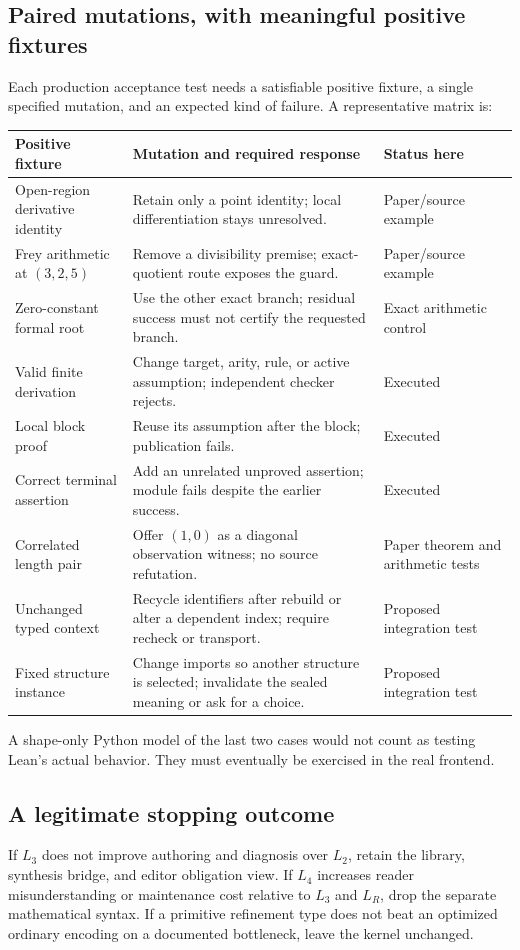 \documentclass[11pt,a4paper]{article}
\theoremstyle{plain}
\theoremstyle{definition}
\theoremstyle{remark}
\begin{document}
\subsection{Paired mutations, with meaningful positive fixtures}
Each production acceptance test needs a satisfiable positive fixture, a single specified mutation, and an expected kind of failure. A representative matrix is:
\begin{center}\small
\begin{tabularx}{\textwidth}{@{}P{.28\textwidth}Y P{.18\textwidth}@{}}
\toprule Positive fixture & Mutation and required response & Status here\\\midrule
Open-region derivative identity & Retain only a point identity; local differentiation stays unresolved. & Paper/source example\\
Frey arithmetic at $(3,2,5)$ & Remove a divisibility premise; exact-quotient route exposes the guard. & Paper/source example\\
Zero-constant formal root & Use the other exact branch; residual success must not certify the requested branch. & Exact arithmetic control\\
Valid finite derivation & Change target, arity, rule, or active assumption; independent checker rejects. & Executed\\
Local block proof & Reuse its assumption after the block; publication fails. & Executed\\
Correct terminal assertion & Add an unrelated unproved assertion; module fails despite the earlier success. & Executed\\
Correlated length pair & Offer $(1,0)$ as a diagonal observation witness; no source refutation. & Paper theorem and arithmetic tests\\
Unchanged typed context & Recycle identifiers after rebuild or alter a dependent index; require recheck or transport. & Proposed integration test\\
Fixed structure instance & Change imports so another structure is selected; invalidate the sealed meaning or ask for a choice. & Proposed integration test\\
\bottomrule
\end{tabularx}
\end{center}
A shape-only Python model of the last two cases would not count as testing Lean's actual behavior. They must eventually be exercised in the real frontend.

\subsection{A legitimate stopping outcome}
If $L_3$ does not improve authoring and diagnosis over $L_2$, retain the library, synthesis bridge, and editor obligation view. If $L_4$ increases reader misunderstanding or maintenance cost relative to $L_3$ and $L_R$, drop the separate mathematical syntax. If a primitive refinement type does not beat an optimized ordinary encoding on a documented bottleneck, leave the kernel unchanged.
\end{document}
